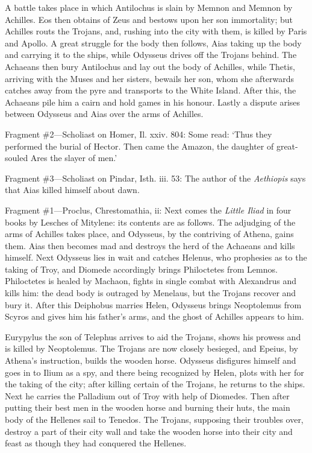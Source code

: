 A battle takes place in which Antilochus is slain by Memnon and Memnon by
Achilles. Eos then obtains of Zeus and bestows upon her son immortality; but
Achilles routs the Trojans, and, rushing into the city with them, is killed by
Paris and Apollo. A great struggle for the body then follows, Aias taking up
the body and carrying it to the ships, while Odysseus drives off the Trojans
behind. The Achaeans then bury Antilochus and lay out the body of Achilles,
while Thetis, arriving with the Muses and her sisters, bewails her son, whom
she afterwards catches away from the pyre and transports to the White Island.
After this, the Achaeans pile him a cairn and hold games in his honour. Lastly
a dispute arises between Odysseus and Aias over the arms of Achilles.

Fragment \#2—Scholiast on Homer, Il. xxiv. 804: Some read: ‘Thus
they performed the burial of Hector. Then came the Amazon, the daughter of
great-souled Ares the slayer of men.’

Fragment \#3—Scholiast on Pindar, Isth. iii. 53: The author of the
\emph{Aethiopis} says that Aias killed himself about dawn.


Fragment \#1—Proclus, Chrestomathia, ii: Next comes the \emph{Little
Iliad} in four books by Lesches of Mitylene: its contents are as follows.
The adjudging of the arms of Achilles takes place, and Odysseus, by the
contriving of Athena, gains them. Aias then becomes mad and destroys the herd
of the Achaeans and kills himself. Next Odysseus lies in wait and catches
Helenus, who prophesies as to the taking of Troy, and Diomede accordingly
brings Philoctetes from Lemnos. Philoctetes is healed by Machaon, fights in
single combat with Alexandrus and kills him: the dead body is outraged by
Menelaus, but the Trojans recover and bury it. After this Deiphobus marries
Helen, Odysseus brings Neoptolemus from Scyros and gives him his father’s
arms, and the ghost of Achilles appears to him.

Eurypylus the son of Telephus arrives to aid the Trojans, shows his prowess and
is killed by Neoptolemus. The Trojans are now closely besieged, and Epeius, by
Athena’s instruction, builds the wooden horse. Odysseus disfigures
himself and goes in to Ilium as a spy, and there being recognized by Helen,
plots with her for the taking of the city; after killing certain of the
Trojans, he returns to the ships. Next he carries the Palladium out of Troy
with help of Diomedes. Then after putting their best men in the wooden horse
and burning their huts, the main body of the Hellenes sail to Tenedos. The
Trojans, supposing their troubles over, destroy a part of their city wall and
take the wooden horse into their city and feast as though they had conquered
the Hellenes.

